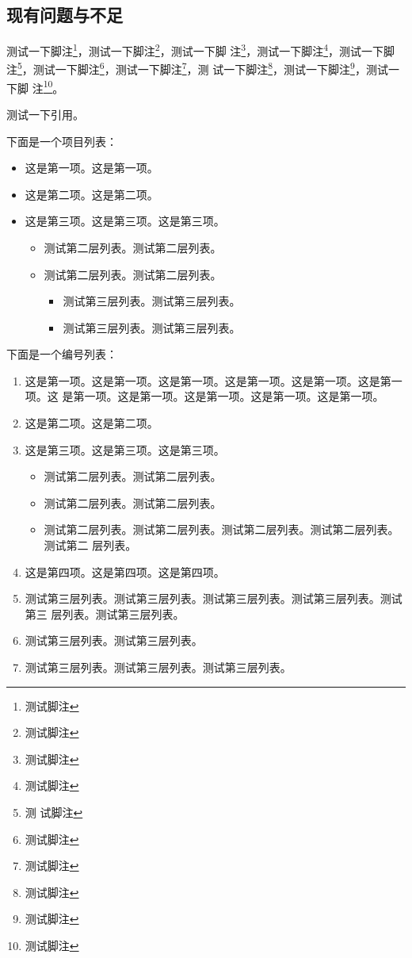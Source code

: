 \subsection{现有问题与不足}

测试一下脚注\footnote{测试脚注}，测试一下脚注\footnote{测试脚注}，测试一下脚
注\footnote{测试脚注}，测试一下脚注\footnote{测试脚注}，测试一下脚注\footnote{测
  试脚注}，测试一下脚注\footnote{测试脚注}，测试一下脚注\footnote{测试脚注}，测
试一下脚注\footnote{测试脚注}，测试一下脚注\footnote{测试脚注}，测试一下脚
注\footnote{测试脚注}。

测试一下引用\cite{ACE05}。

下面是一个项目列表：

\begin{itemize}
\item 这是第一项。这是第一项。
\item 这是第二项。这是第二项。
\item 这是第三项。这是第三项。这是第三项。
  \begin{itemize}
  \item 测试第二层列表。测试第二层列表。
  \item 测试第二层列表。测试第二层列表。
  \begin{itemize}
     \item 测试第三层列表。测试第三层列表。
     \item 测试第三层列表。测试第三层列表。
  \end{itemize}
  \end{itemize}
\end{itemize}

下面是一个编号列表：

\begin{enumerate}
\item 这是第一项。这是第一项。这是第一项。这是第一项。这是第一项。这是第一项。这
  是第一项。这是第一项。这是第一项。这是第一项。这是第一项。
\item 这是第二项。这是第二项。
\item 这是第三项。这是第三项。这是第三项。
  \begin{itemize}
  \item 测试第二层列表。测试第二层列表。
  \item 测试第二层列表。测试第二层列表。
  \item 测试第二层列表。测试第二层列表。测试第二层列表。测试第二层列表。测试第二
    层列表。
  \end{itemize}
\item 这是第四项。这是第四项。这是第四项。
  \item 测试第三层列表。测试第三层列表。测试第三层列表。测试第三层列表。测试第三
    层列表。测试第三层列表。
  \item 测试第三层列表。测试第三层列表。
  \item 测试第三层列表。测试第三层列表。测试第三层列表。
\end{enumerate}

